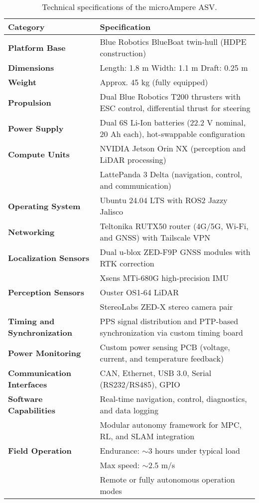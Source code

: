 \begin{table}[H]
    \centering
    \caption{Technical specifications of the microAmpere ASV.}
    \label{tab:microampere_specs}
    \begin{tabular}{|p{4cm}|p{9cm}|}
        \hline
        \textbf{Category} & \textbf{Specification} \\ \hline
        \textbf{Platform Base} & Blue Robotics BlueBoat twin-hull (HDPE construction) \\ \hline
        \textbf{Dimensions} & Length: 1.8 m \quad Width: 1.1 m \quad Draft: 0.25 m \\ \hline
        \textbf{Weight} & Approx. 45 kg (fully equipped) \\ \hline
        \textbf{Propulsion} & Dual Blue Robotics T200 thrusters with ESC control, differential thrust for steering \\ \hline
        \textbf{Power Supply} & Dual 6S Li-Ion batteries (22.2 V nominal, 20 Ah each), hot-swappable configuration \\ \hline
        \textbf{Compute Units} & NVIDIA Jetson Orin NX (perception and LiDAR processing) \\ 
        & LattePanda 3 Delta (navigation, control, and communication) \\ \hline
        \textbf{Operating System} & Ubuntu 24.04 LTS with ROS2 Jazzy Jalisco \\ \hline
        \textbf{Networking} & Teltonika RUTX50 router (4G/5G, Wi-Fi, and GNSS) with Tailscale VPN \\ \hline
        \textbf{Localization Sensors} & Dual u-blox ZED-F9P GNSS modules with RTK correction \\ 
        & Xsens MTi-680G high-precision IMU \\ \hline
        \textbf{Perception Sensors} & Ouster OS1-64 LiDAR \\ 
        & StereoLabs ZED-X stereo camera pair \\ \hline
        \textbf{Timing and Synchronization} & PPS signal distribution and PTP-based synchronization via custom timing board \\ \hline
        \textbf{Power Monitoring} & Custom power sensing PCB (voltage, current, and temperature feedback) \\ \hline
        \textbf{Communication Interfaces} & CAN, Ethernet, USB 3.0, Serial (RS232/RS485), GPIO \\ \hline
        \textbf{Software Capabilities} & Real-time navigation, control, diagnostics, and data logging \\ 
        & Modular autonomy framework for MPC, RL, and SLAM integration \\ \hline
        \textbf{Field Operation} & Endurance: $\sim$3 hours under typical load \\ 
        & Max speed: $\sim$2.5 m/s \\ 
        & Remote or fully autonomous operation modes \\ \hline
    \end{tabular}
\end{table}
